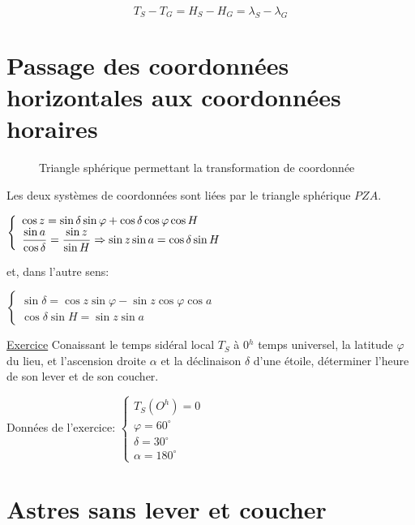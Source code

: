 \documentclass[12pt]{report}
\begin{document}
\begin{equation*}
T_S - T_G = H_S - H_G = \lambda_S - \lambda_G
\end{equation*}


\section{Passage des coordonnées horizontales aux coordonnées horaires}


\begin{figure}[ht]
\begin{center}
\end{center}
\caption{Triangle sphérique permettant la transformation de coordonnée}
\label{fig:19}
\end{figure}


Les deux systèmes de coordonnées sont liées par le triangle sphérique $PZA$. 

$
\left\{
\begin{array}{lll}
\cos z = \sin \delta \sin \varphi + \cos \delta \cos \varphi \cos H\\
\displaystyle {\sin a \over \cos \delta} = {\sin z \over \sin H} \Rightarrow \sin z \sin a = \cos \delta \sin H
\end{array}
\right.
$

\bigskip

et, dans l'autre sens:

\bigskip


$
\left\{
\begin{array}{lll}
  \sin \delta =  \cos z  \sin \varphi  - \sin z \cos \varphi \cos a\\
\cos \delta \sin H = \sin z \sin a
\end{array}
\right.
$
\bigskip

\underline{Exercice} 
Conaissant le temps sidéral local $T_S$ à 0$^h$ temps universel, la latitude $\varphi$ du lieu, et l'ascension droite $\alpha$ et la déclinaison $\delta$ d'une étoile, déterminer l'heure de son lever et de son coucher. 

Données de l'exercice:
\bigskip
$
\left\{
\begin{array}{lll}
T_S (O^h) = 0\\
\varphi = 60^\circ\\
\delta = 30^\circ\\
\alpha = 180^\circ
\end{array}
\right.
$

\newpage
\section{Astres sans lever et coucher \label{lever}}
\end{document}

